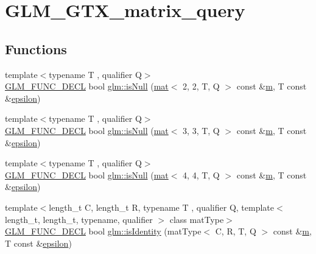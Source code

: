 \hypertarget{group__gtx__matrix__query}{}\section{G\+L\+M\+\_\+\+G\+T\+X\+\_\+matrix\+\_\+query}
\label{group__gtx__matrix__query}
\subsection*{Functions}
\begin{DoxyCompactItemize}
\item 
{\footnotesize template$<$typename T , qualifier Q$>$ }\\\mbox{\hyperlink{setup_8hpp_ab2d052de21a70539923e9bcbf6e83a51}{G\+L\+M\+\_\+\+F\+U\+N\+C\+\_\+\+D\+E\+CL}} bool \mbox{\hyperlink{group__gtx__matrix__query_ga9790ec222ce948c0ff0d8ce927340dba}{glm\+::is\+Null}} (\mbox{\hyperlink{structglm_1_1mat}{mat}}$<$ 2, 2, T, Q $>$ const \&\mbox{\hyperlink{_s_d_l__opengl__glext_8h_af593500c283bf1a787a6f947f503a5c2}{m}}, T const \&\mbox{\hyperlink{group__gtc__constants_ga2a1e57fc5592b69cfae84174cbfc9429}{epsilon}})
\item 
{\footnotesize template$<$typename T , qualifier Q$>$ }\\\mbox{\hyperlink{setup_8hpp_ab2d052de21a70539923e9bcbf6e83a51}{G\+L\+M\+\_\+\+F\+U\+N\+C\+\_\+\+D\+E\+CL}} bool \mbox{\hyperlink{group__gtx__matrix__query_gae14501c6b14ccda6014cc5350080103d}{glm\+::is\+Null}} (\mbox{\hyperlink{structglm_1_1mat}{mat}}$<$ 3, 3, T, Q $>$ const \&\mbox{\hyperlink{_s_d_l__opengl__glext_8h_af593500c283bf1a787a6f947f503a5c2}{m}}, T const \&\mbox{\hyperlink{group__gtc__constants_ga2a1e57fc5592b69cfae84174cbfc9429}{epsilon}})
\item 
{\footnotesize template$<$typename T , qualifier Q$>$ }\\\mbox{\hyperlink{setup_8hpp_ab2d052de21a70539923e9bcbf6e83a51}{G\+L\+M\+\_\+\+F\+U\+N\+C\+\_\+\+D\+E\+CL}} bool \mbox{\hyperlink{group__gtx__matrix__query_ga2b98bb30a9fefa7cdea5f1dcddba677b}{glm\+::is\+Null}} (\mbox{\hyperlink{structglm_1_1mat}{mat}}$<$ 4, 4, T, Q $>$ const \&\mbox{\hyperlink{_s_d_l__opengl__glext_8h_af593500c283bf1a787a6f947f503a5c2}{m}}, T const \&\mbox{\hyperlink{group__gtc__constants_ga2a1e57fc5592b69cfae84174cbfc9429}{epsilon}})
\item 
{\footnotesize template$<$length\+\_\+t C, length\+\_\+t R, typename T , qualifier Q, template$<$ length\+\_\+t, length\+\_\+t, typename, qualifier $>$ class mat\+Type$>$ }\\\mbox{\hyperlink{setup_8hpp_ab2d052de21a70539923e9bcbf6e83a51}{G\+L\+M\+\_\+\+F\+U\+N\+C\+\_\+\+D\+E\+CL}} bool \mbox{\hyperlink{group__gtx__matrix__query_gaee935d145581c82e82b154ccfd78ad91}{glm\+::is\+Identity}} (mat\+Type$<$ C, R, T, Q $>$ const \&\mbox{\hyperlink{_s_d_l__opengl__glext_8h_af593500c283bf1a787a6f947f503a5c2}{m}}, T const \&\mbox{\hyperlink{group__gtc__constants_ga2a1e57fc5592b69cfae84174cbfc9429}{epsilon}})

\end{DoxyCompactItemize}
